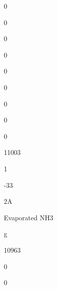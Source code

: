 \documentclass[a4paper,portrait,12pt]{article}
\begin{document}
0





0





0





0





0





0





0





0





0





11003





1





-33





\begin{flushleft}
2A
\end{flushleft}





\begin{flushleft}
Evaporated NH3
\end{flushleft}





\begin{flushleft}
g
\end{flushleft}





10963





0





0
\end{document}
